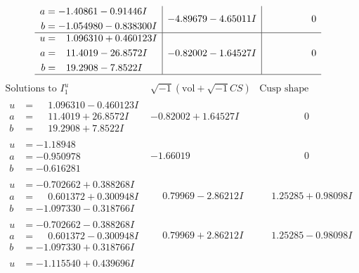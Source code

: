 \documentclass[1p]{elsarticle_modified}
\theoremstyle{definition}
\newcommand{\I}{\sqrt{-1}}
\begin{document}
$$\begin{array}{c|c|c}
\begin{aligned}
a &= -1.40861 - 0.91446 I \\
b &= -1.054980 - 0.838300 I\end{aligned}
 & -4.89679 - 4.65011 I & \phantom{-0.000000 } 0 \\ \hline\begin{aligned}
u &= \phantom{-}1.096310 + 0.460123 I \\
a &= \phantom{-}11.4019 - 26.8572 I \\
b &= \phantom{-}19.2908 - 7.8522 I\end{aligned}
 & -0.82002 - 1.64527 I & \phantom{-0.000000 } 0\\
 \hline 
 \end{array}$$\newpage$$\begin{array}{c|c|c}  
\text{Solutions to }I^u_{1}& \I (\text{vol} + \sqrt{-1}CS) & \text{Cusp shape}\\
 \hline 
\begin{aligned}
u &= \phantom{-}1.096310 - 0.460123 I \\
a &= \phantom{-}11.4019 + 26.8572 I \\
b &= \phantom{-}19.2908 + 7.8522 I\end{aligned}
 & -0.82002 + 1.64527 I & \phantom{-0.000000 } 0 \\ \hline\begin{aligned}
u &= -1.18948\phantom{ +0.000000I} \\
a &= -0.950978\phantom{ +0.000000I} \\
b &= -0.616281\phantom{ +0.000000I}\end{aligned}
 & -1.66019\phantom{ +0.000000I} & \phantom{-0.000000 } 0 \\ \hline\begin{aligned}
u &= -0.702662 + 0.388268 I \\
a &= \phantom{-}0.601372 + 0.300948 I \\
b &= -1.097330 - 0.318766 I\end{aligned}
 & \phantom{-}0.79969 - 2.86212 I & \phantom{-}1.25285 + 0.98098 I \\ \hline\begin{aligned}
u &= -0.702662 - 0.388268 I \\
a &= \phantom{-}0.601372 - 0.300948 I \\
b &= -1.097330 + 0.318766 I\end{aligned}
 & \phantom{-}0.79969 + 2.86212 I & \phantom{-}1.25285 - 0.98098 I \\ \hline\begin{aligned}
u &= -1.115540 + 0.439696 I \\

\end{aligned}
\end{array}$$
\end{document}
